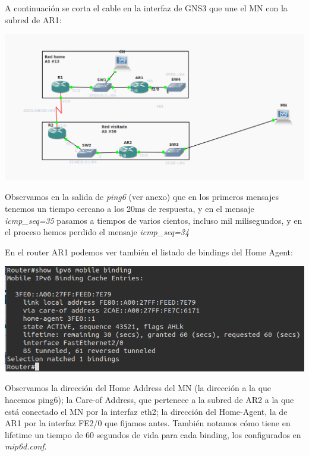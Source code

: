 \documentclass{article}
\begin{document}


A continuación se corta el cable en la interfaz de GNS3 que une el MN con la subred de AR1:

\begin{center} 
	\includegraphics[scale=0.4]{images/topdesc.png}
\end{center}

Observamos en la salida de \textit{ping6} (ver anexo) que en los primeros mensajes tenemos un tiempo cercano a los 20ms de respuesta, y en el mensaje \textit{icmp\_seq=35} pasamos a tiempos de varios cientos, incluso mil milisegundos, y en el proceso hemos perdido el mensaje \textit{icmp\_seq=34}

En el router AR1 podemos ver también el listado de bindings del Home Agent:

\begin{center} 
	\includegraphics[scale=0.6]{images/ar1binding.png}
\end{center}

Observamos la dirección del Home Address del MN (la dirección a la que hacemos ping6); la Care-of Address, que pertenece a la subred de AR2 a la que está conectado el MN por la interfaz eth2; la dirección del Home-Agent, la de AR1 por la interfaz FE2/0 que fijamos antes. También notamos cómo tiene en lifetime un tiempo de 60 segundos de vida para cada binding, los configurados en \textit{mip6d.conf}.
\end{document}
